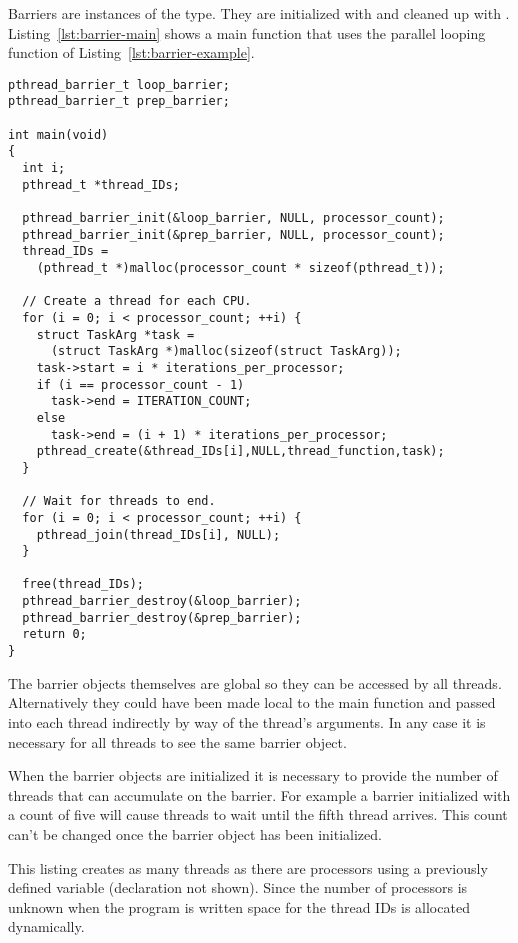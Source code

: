 Barriers are instances of the  type. They are initialized with
 and cleaned up with .
Listing~\ref{lst:barrier-main} shows a main function that uses the parallel looping function of
Listing~\ref{lst:barrier-example}.

\begin{lstlisting}[float=tp,frame=single,xleftmargin=0in, caption={Barrier
Example Main},label=lst:barrier-main]
pthread_barrier_t loop_barrier;
pthread_barrier_t prep_barrier;

int main(void)
{
  int i;
  pthread_t *thread_IDs;

  pthread_barrier_init(&loop_barrier, NULL, processor_count);
  pthread_barrier_init(&prep_barrier, NULL, processor_count);
  thread_IDs =
    (pthread_t *)malloc(processor_count * sizeof(pthread_t));

  // Create a thread for each CPU.
  for (i = 0; i < processor_count; ++i) {
    struct TaskArg *task =
      (struct TaskArg *)malloc(sizeof(struct TaskArg));
    task->start = i * iterations_per_processor;
    if (i == processor_count - 1)
      task->end = ITERATION_COUNT;
    else
      task->end = (i + 1) * iterations_per_processor;
    pthread_create(&thread_IDs[i],NULL,thread_function,task);
  }

  // Wait for threads to end.
  for (i = 0; i < processor_count; ++i) {
    pthread_join(thread_IDs[i], NULL);
  }

  free(thread_IDs);
  pthread_barrier_destroy(&loop_barrier);
  pthread_barrier_destroy(&prep_barrier);
  return 0;
}
\end{lstlisting}

The barrier objects themselves are global so they can be accessed by all threads. Alternatively
they could have been made local to the main function and passed into each thread indirectly by
way of the thread's arguments. In any case it is necessary for all threads to see the same
barrier object.

When the barrier objects are initialized it is necessary to provide the number of threads that
can accumulate on the barrier. For example a barrier initialized with a count of five will cause
threads to wait until the fifth thread arrives. This count can't be changed once the barrier
object has been initialized.

This listing creates as many threads as there are processors using a previously defined variable
 (declaration not shown). Since the number of processors is unknown
when the program is written space for the thread IDs is allocated dynamically.


